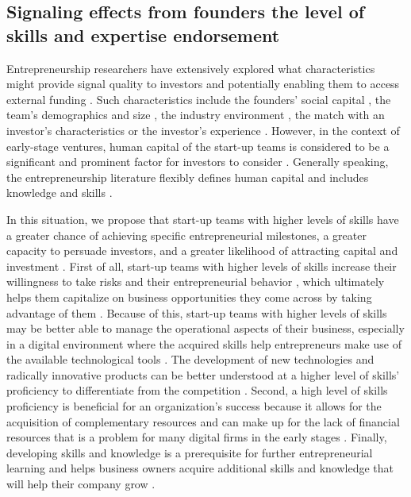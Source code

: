 \documentclass[12pt]{article}
\begin{document}
\subsection{Signaling effects from founders the level of skills and expertise endorsement}

Entrepreneurship researchers have extensively explored what characteristics might provide signal quality to investors and potentially enabling them to access external funding \citep{roure1990predictors, reese2020should}. Such characteristics include the founders' social capital \citep{shane2002network}, the team's demographics and size \citep{eisenhardt1990organizational}, the industry environment \citep{townsend2015turning}, the match with an investor's characteristics \citep{aggarwal2015evaluating} or the investor's experience \citep{franke2008venture}. However, in the context of early-stage ventures, human capital of the start-up teams is considered to be a significant and prominent factor for investors to consider \citep{beckman2007early, ko2018signaling, matusik2008values}. Generally speaking, the entrepreneurship literature flexibly defines human capital and includes knowledge and skills \citep{marvel2016human}.

In this situation, we propose that start-up teams with higher levels of skills have a greater chance of achieving specific entrepreneurial milestones, a greater capacity to persuade investors, and a greater likelihood of attracting capital and investment \citep{zarutskie2010role}. First of all, start-up teams with higher levels of skills increase their willingness to take risks and their entrepreneurial behavior \citep{becherer1999proactive}, which ultimately helps them capitalize on business opportunities they come across by taking advantage of them \citep{shane2000promise, chandler1994founder}. Because of this, start-up teams with higher levels of skills may be better able to manage the operational aspects of their business, especially in a digital environment where the acquired skills help entrepreneurs make use of the available technological tools \citep{nambisan2017digital}. The development of new technologies and radically innovative products can be better understood at a higher level of skills' proficiency to differentiate from the competition \citep{marvel2007technology}. Second, a high level of skills proficiency is beneficial for an organization's success because it allows for the acquisition of complementary resources and can make up for the lack of financial resources that is a problem for many digital firms in the early stages \citep{beckman2007early}. Finally, developing skills and knowledge is a prerequisite for further entrepreneurial learning and helps business owners acquire additional skills and knowledge that will help their company grow \citep{hunter1986cognitive}.
\end{document}
